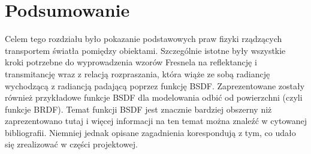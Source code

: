 \section*{Podsumowanie}
Celem tego rozdziału było pokazanie podstawowych praw fizyki rządzących transportem światła pomiędzy obiektami. Szczególnie istotne były wszystkie kroki potrzebne do wyprowadzenia wzorów Fresnela na reflektancję i transmitancję wraz z relacją rozpraszania, która wiąże ze sobą radiancję wychodzącą z radiancją padającą poprzez funkcję BSDF. Zaprezentowane zostały również przykładowe funkcje BSDF dla modelowania odbić od powierzchni (czyli funkcje BRDF). Temat funkcji BSDF jest znacznie bardziej obszerny niż zaprezentowano tutaj i więcej informacji na ten temat można znaleźć w cytowanej bibliografii. Niemniej jednak opisane zagadnienia korespondują z tym, co udało się zrealizować w części projektowej.

